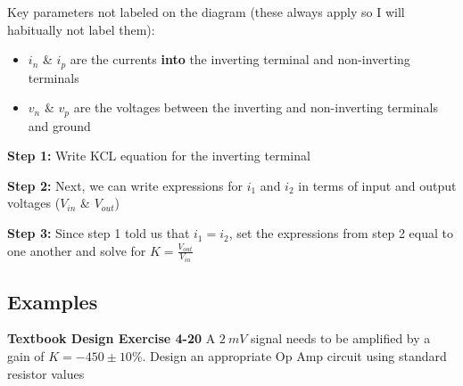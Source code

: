 \documentclass{handout}
\begin{document}
Key parameters not labeled on the diagram (these always apply so I will habitually not label them):
\begin{itemize}
\item $i_n$ \& $i_p$ are the currents \textbf{into} the inverting terminal and non-inverting terminals
\item $v_n$ \& $v_p$ are the voltages between the inverting and non-inverting terminals and ground
\end{itemize}

\textbf{Step 1:}  Write KCL equation for the inverting terminal

\textbf{Step 2:} Next, we can write expressions for $i_1$ and $i_2$ in terms of input and output voltages ($V_{in}$ \& $V_{out}$)

\textbf{Step 3:} Since step 1 told us that $i_1=i_2$, set the expressions from step 2 equal to one another and solve for $K=\frac{V_{out}}{V_{in}}$


\subsection{Examples}
\textbf{Textbook Design Exercise 4-20}
A $2\ mV$ signal needs to be amplified by a gain of $K=-450 \pm 10\%$.  Design an appropriate Op Amp circuit using standard resistor values
\end{document}
